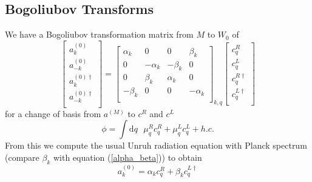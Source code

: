 \documentclass[12pt,a4paper]{article}
\newcommand{\dv}[1]{\mathrm{d} #1 \text{ }}
\begin{document}
\subsection{Bogoliubov Transforms}
We have a Bogoliubov transformation matrix from $M$ to $W_0$ of
\begin{equation}
  \left[ \begin{array}{l}
    a^{(0)}_k \\
    a^{(0)}_{-k} \\
    \hline
    a^{(0)\dagger}_k \\
    a^{(0)\dagger}_{-k} \\
 \end{array} \right] = 
  \left[
\begin{array}{rr|rr}
    \alpha_k &       0   &  0       & \beta_k \\
    0        & -\alpha_k & -\beta_k & 0 \\
    \hline
    0        & \beta_k   & \alpha_k & 0 \\
    -\beta_k &    0      &   0      & -\alpha_k \\
\end{array} \right]_{k,q}
\left[ \begin{array}{l}
    c^R_q \\
    c^L_q \\
    \hline
    c^{R\dagger}_q \\
    c^{L\dagger}_q \\
 \end{array} \right]
\end{equation}
for a change of basis from $a^{(M)}$ to $c^R$ and $c^L$
\begin{equation}
  \phi = \int \dv{q} \mu_q^R c_q^R + \mu_q^L c_q^L + h.c.
  \label{c_ladder}
\end{equation}
From this we compute the usual Unruh radiation equation with Planck spectrum (compare $\beta_k$ with equation (\ref{alpha_beta})) to obtain
\begin{equation}
  a_k^{(0)} = \alpha_k c_q^R + \beta_k c_q^{L\dagger}
\label{a_in_c}
\end{equation}
\end{document}

